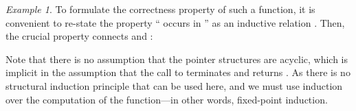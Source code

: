 \documentclass[copyright,creativecommons,sharealike]{eptcs}
\theoremstyle{remark}
\newtheorem{example}{Example}
\begin{document}
\begin{isabellebody}
\begin{isamarkuptext}
\begin{example}
  To formulate the correctness property of such a function, it is
  convenient to re-state the property `` occurs in '' as an inductive relation 
  .
  Then, the crucial property connects  and :
  \begin{quote}
  \end{quote}
  Note that there is no assumption that the pointer structures
  are acyclic, which is implicit in the assumption that
  the call to  terminates and returns  .
  As there is no structural induction principle that can be used here,
  and we must use induction over the computation of the function---in
  other words, fixed-point induction.
  

\end{example}
\end{isamarkuptext}
\end{isabellebody}
\end{document}
